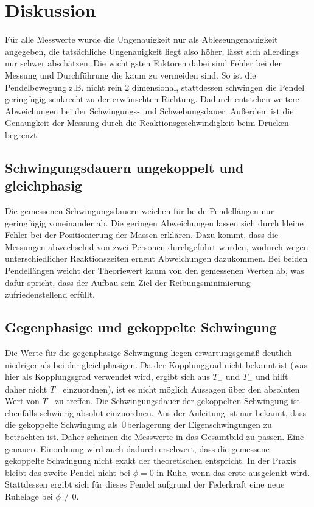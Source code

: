 \section{Diskussion}
\label{sec:Diskussion}
Für alle Messwerte wurde die Ungenauigkeit nur als Ableseungenauigkeit
angegeben, die tatsächliche Ungenauigkeit liegt also höher, lässt sich allerdings
nur schwer abschätzen. Die wichtigsten Faktoren dabei sind Fehler bei der
Messung und Durchführung die kaum zu vermeiden sind. So ist die Pendelbewegung
z.B. nicht rein 2 dimensional, stattdessen schwingen die Pendel geringfügig
senkrecht zu der erwünschten Richtung. Dadurch entstehen weitere Abweichungen
bei der Schwingungs- und Schwebungsdauer. Außerdem ist die Genauigkeit der
Messung durch die Reaktionsgeschwindigkeit beim Drücken begrenzt.

\subsection{Schwingungsdauern ungekoppelt und gleichphasig}
Die gemessenen Schwingungsdauern weichen für beide Pendellängen nur
geringfügig voneinander ab. Die geringen Abweichungen lassen sich durch
kleine Fehler bei der Positionierung der Massen erklären.
Dazu kommt, dass die Messungen abwechselnd von zwei Personen durchgeführt wurden,
wodurch wegen unterschiedlicher Reaktionszeiten erneut Abweichungen dazukommen.
Bei beiden Pendellängen weicht der Theoriewert kaum von den gemessenen Werten ab,
was dafür spricht, dass der Aufbau sein Ziel der Reibungsminimierung
zufriedenstellend erfüllt.

\subsection{Gegenphasige und gekoppelte Schwingung}
Die Werte für die gegenphasige Schwingung liegen erwartungsgemäß deutlich
niedriger als bei der gleichphasigen. Da der Kopplunggrad nicht bekannt ist
(was hier als Kopplungsgrad verwendet wird, ergibt sich aus $T_+$ und $T_-$ und
hilft daher nicht $T_-$ einzuordnen), ist es nicht möglich Aussagen über
den absoluten Wert von $T_-$ zu treffen.
Die Schwingungsdauer der gekoppelten Schwingung ist ebenfalls schwierig
absolut einzuordnen. Aus der Anleitung ist nur bekannt, dass die gekoppelte
Schwingung als Überlagerung der Eigenschwingungen zu betrachten ist.
Daher scheinen die Messwerte in das Gesamtbild zu passen. Eine genauere
Einordnung wird auch dadurch erschwert, dass die gemessene gekoppelte Schwingung
nicht exakt der theoretischen entspricht. In der Praxis bleibt das zweite
Pendel nicht bei $\phi=0$ in Ruhe, wenn das erste ausgelenkt wird. Stattdessen
ergibt sich für dieses Pendel aufgrund der Federkraft eine neue Ruhelage bei
$\phi \neq 0$.

